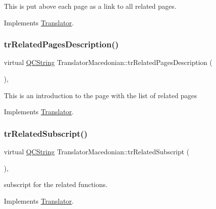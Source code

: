This is put above each page as a link to all related pages. 

Implements \mbox{\hyperlink{class_translator}{Translator}}.

\mbox{\label{class_translator_macedonian_a66c46f2430c4d38af87202df3a48726a}} 
\subsubsection{\texorpdfstring{trRelatedPagesDescription()}{trRelatedPagesDescription()}}
{\footnotesize\ttfamily virtual \mbox{\hyperlink{class_q_c_string}{Q\+C\+String}} Translator\+Macedonian\+::tr\+Related\+Pages\+Description (\begin{DoxyParamCaption}{ }\end{DoxyParamCaption})\hspace{0.3cm}{\ttfamily [inline]}, {\ttfamily [virtual]}}

This is an introduction to the page with the list of related pages 

Implements \mbox{\hyperlink{class_translator}{Translator}}.

\mbox{\label{class_translator_macedonian_a3fcf803f9d4b60a47a2654e4effd9b3f}} 
\subsubsection{\texorpdfstring{trRelatedSubscript()}{trRelatedSubscript()}}
{\footnotesize\ttfamily virtual \mbox{\hyperlink{class_q_c_string}{Q\+C\+String}} Translator\+Macedonian\+::tr\+Related\+Subscript (\begin{DoxyParamCaption}{ }\end{DoxyParamCaption})\hspace{0.3cm}{\ttfamily [inline]}, {\ttfamily [virtual]}}

subscript for the related functions. 

Implements \mbox{\hyperlink{class_translator}{Translator}}.

\mbox{\label{class_translator_macedonian_a9ffb72f288f241ef2f3f9d479bf0f6ae}} 
